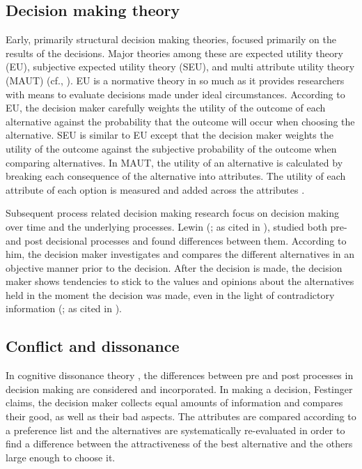 \subsection{Decision making theory}




Early, primarily structural decision making theories, focused
primarily on the results of the decisions.  Major theories among these
are expected utility theory (EU),  subjective expected utility theory
(SEU), and multi attribute utility theory (MAUT) (cf., \cite{baron94}).
EU is a normative theory in so much as it provides researchers with
means to evaluate decisions made under ideal circumstances.  According
to EU, the decision maker carefully weights the utility of the outcome
of each alternative against the probability that the outcome will
occur when choosing the alternative.  SEU is similar to EU except that
the decision maker weights the utility of the outcome against the
subjective probability of the outcome when comparing alternatives.  In
MAUT, the utility of an alternative is calculated by breaking each
consequence of the alternative into attributes.  The utility of each
attribute of each option is measured and added across the attributes
\parencite{baron94}.




Subsequent process related decision making research focus on decision
making over time and the underlying processes. Lewin (\cite{lewin51}; as
cited in \cite{festinger64}), studied both pre- and post decisional
processes and found differences between them.  According to him, the
decision maker investigates and compares the different alternatives in
an objective manner prior to the decision.  After the decision is
made, the decision maker shows tendencies to stick to the values and
opinions about the alternatives held in the moment the decision was
made, even in the light of contradictory information (\cite{lewin51}; as
cited in \cite{festinger64}).


\subsection{Conflict and dissonance}

In cognitive dissonance theory \parencite{festinger64}, the differences
between pre and post processes in decision making are considered and
incorporated.  In making a decision, Festinger claims, the decision
maker collects equal amounts of information and compares their good,
as well as their bad aspects.  The attributes are compared according
to a preference list and the alternatives are systematically
re-evaluated in order to find a difference between the attractiveness
of the best alternative and the others large enough to choose it.

